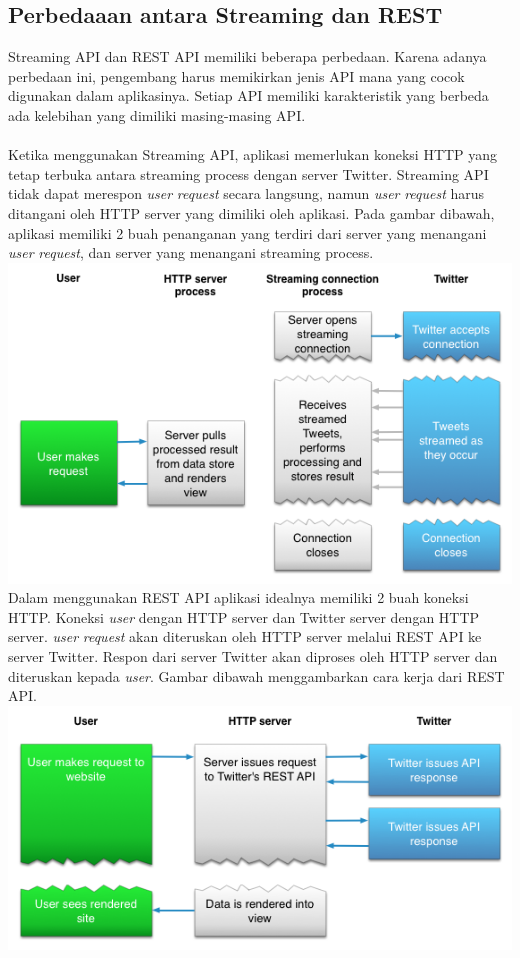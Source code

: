 \subsection{Perbedaaan antara Streaming dan REST}
Streaming API dan REST API memiliki beberapa perbedaan. Karena adanya perbedaan ini, pengembang harus memikirkan jenis API mana yang cocok digunakan dalam aplikasinya. Setiap API memiliki karakteristik yang berbeda ada kelebihan yang dimiliki masing-masing API.\\\\
Ketika menggunakan Streaming API, aplikasi memerlukan koneksi HTTP yang tetap terbuka antara streaming process dengan server Twitter. Streaming API tidak dapat merespon \textit{user} \textit{request} secara langsung, namun \textit{user} \textit{request} harus ditangani oleh HTTP server yang dimiliki oleh aplikasi. Pada gambar dibawah, aplikasi memiliki 2 buah penanganan yang terdiri dari server yang menangani \textit{user} \textit{request}, dan server yang menangani streaming process.\\
\includegraphics[width=\linewidth]{Gambar/mine/streamingapi}
Dalam menggunakan REST API aplikasi idealnya memiliki 2 buah koneksi HTTP. Koneksi \textit{user} dengan HTTP server dan Twitter server dengan HTTP server. \textit{user} \textit{request} akan diteruskan oleh HTTP server melalui REST API ke server Twitter. Respon dari server Twitter akan diproses oleh HTTP server dan diteruskan kepada \textit{user}. Gambar dibawah menggambarkan cara kerja dari REST API.\\
\includegraphics[width=\linewidth]{Gambar/mine/restapi}
